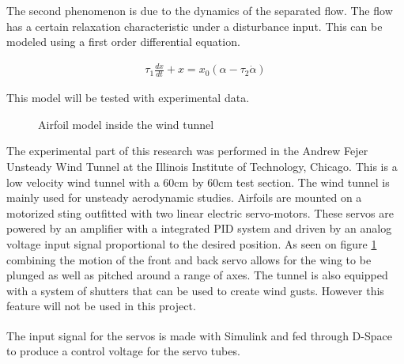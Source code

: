 \par The second phenomenon is due to the dynamics of the separated flow.
The flow has a certain relaxation characteristic under a disturbance input.
This can be modeled using a first order differential equation.

\begin{eqnarray}
  \tau_1 \frac{dx}{dt} +x = x_0(\alpha - \tau_2 \dot{\alpha}) 
  \label{eqn:state_variable}
\end{eqnarray}

This model will be tested with experimental data.



\begin{figure}[h]
  \begin{center}
  \end{center}
  \caption{Airfoil model inside the wind tunnel}
  \label{fig:wind_tunnel}
\end{figure}

The experimental part of this research was performed in the Andrew Fejer Unsteady Wind Tunnel at the Illinois Institute of Technology, Chicago.
This is a low velocity wind tunnel with a 60cm by 60cm test section.
The wind tunnel is mainly used for unsteady aerodynamic studies.
Airfoils are mounted on a motorized sting outfitted with two linear electric servo-motors.
These servos are powered by an amplifier with a integrated PID system and driven by an analog voltage input signal proportional to the desired position.
%
%
As seen on figure \ref{fig:wind_tunnel} combining the motion of the front and back servo allows for the wing to be plunged as well as pitched around a range of axes.
The tunnel is also equipped with a system of shutters that can be used to create wind gusts.
However this feature will not be used in this project.

\par The input signal for the servos is made with Simulink\textsuperscript{\textregistered} and fed through D-Space\textsuperscript{\textregistered} to produce a control voltage for the servo tubes. 


